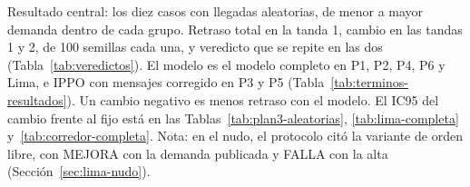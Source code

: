 \begin{table}[!tbp]
\centering
\footnotesize
\setlength{\tabcolsep}{3pt}

\caption[Resultado central: todos los casos con llegadas aleatorias]{Resultado central: los diez casos con llegadas aleatorias, de menor a mayor demanda dentro de cada grupo. Retraso total en la tanda 1, cambio en las tandas 1 y 2, de 100 semillas cada una, y veredicto que se repite en las dos (Tabla~\ref{tab:veredictos}). El modelo es el modelo completo en P1, P2, P4, P6 y Lima, e IPPO con mensajes corregido en P3 y P5 (Tabla~\ref{tab:terminos-resultados}). Un cambio negativo es menos retraso con el modelo. El IC95 del cambio frente al fijo está en las Tablas~\ref{tab:plan3-aleatorias}, \ref{tab:lima-completa} y~\ref{tab:corredor-completa}. Nota: en el nudo, el protocolo citó la variante de orden libre, con MEJORA con la demanda publicada y FALLA con la alta (Sección~\ref{sec:lima-nudo}).}
\label{tab:resultado-final}
\label{tab:plan3-central}
\label{tab:lima-resumen}
\end{table}

